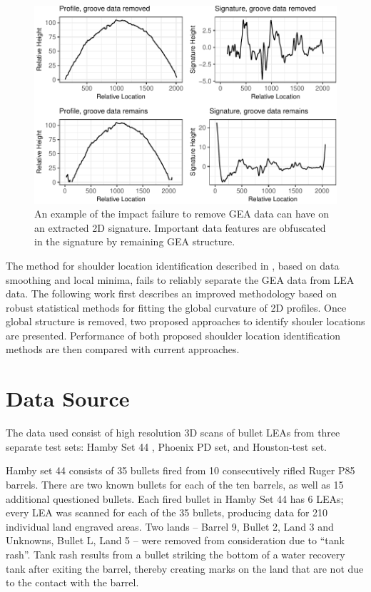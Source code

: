 \documentclass[12pt]{article}
\begin{document}
\begin{figure}
\centering
\includegraphics{writeup_files/figure-latex/groove-no-groove-1.pdf}
\caption{\label{groove-no-groove}An example of the impact failure to
remove GEA data can have on an extracted 2D signature. Important data
features are obfuscated in the signature by remaining GEA structure.}
\end{figure}

The method for shoulder location identification described in
\citet{Hare1}, based on data smoothing and local minima, fails to
reliably separate the GEA data from LEA data. The following work first
describes an improved methodology based on robust statistical methods
for fitting the global curvature of 2D profiles. Once global structure
is removed, two proposed approaches to identify shouler locations are
presented. Performance of both proposed shoulder location identification
methods are then compared with current approaches.

\section{Data Source}

The data used consist of high resolution 3D scans of bullet LEAs from
three separate test sets: Hamby Set 44 \citep{Hamby}, Phoenix PD set,
and Houston-test set.

Hamby set 44 consists of 35 bullets fired from 10 consecutively rifled
Ruger P85 barrels. There are two known bullets for each of the ten
barrels, as well as 15 additional questioned bullets. Each fired bullet
in Hamby Set 44 has 6 LEAs; every LEA was scanned for each of the 35
bullets, producing data for 210 individual land engraved areas. Two
lands -- Barrel 9, Bullet 2, Land 3 and Unknowns, Bullet L, Land 5 --
were removed from consideration due to ``tank rash''. Tank rash results
from a bullet striking the bottom of a water recovery tank after exiting
the barrel, thereby creating marks on the land that are not due to the
contact with the barrel.
\end{document}
